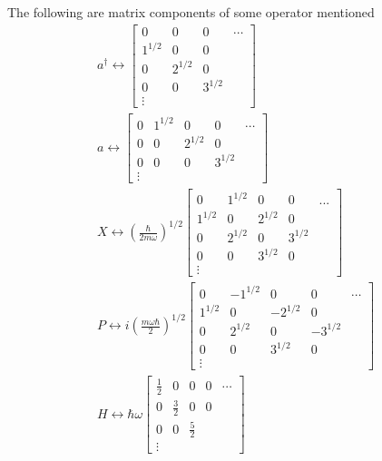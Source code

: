 \documentclass[../../../main.tex]{subfiles}
\begin{document}
The following are matrix components of some operator mentioned
\begin{gather*}
  a ^\dagger\leftrightarrow\begin{bmatrix}
    0 & 0 & 0 & \cdots \\ 1^{1/2} & 0 & 0 & \\ 0 & 2^{1/2} & 0 & \\ 0 & 0 & 3^{1/2} & \\ \vdots & & &
  \end{bmatrix}                                                                                                                                         \\
  a \leftrightarrow\begin{bmatrix}
    0 & 1^{1/2} & 0 & 0 & \cdots \\ 0 & 0 & 2^{1/2} & 0 & \\ 0 & 0 & 0 & 3^{1/2} & \\ \vdots & & & &
  \end{bmatrix}                                                                                                                                          \\
  X \leftrightarrow \left( \frac{\hbar}{2m\omega} \right)^{1/2} \begin{bmatrix} 0 & 1^{1/2} & 0 & 0 & ... \\ 1^{1/2} & 0 & 2^{1/2} & 0 & \\ 0 & 2^{1/2} & 0 & 3^{1/2} & \\ 0 & 0 & 3^{1/2} & 0 & \\ \vdots & & & & \end{bmatrix}           \\
  P \leftrightarrow i \left( \frac{m \omega \hbar}{2} \right)^{1/2} \begin{bmatrix} 0 & -1^{1/2} & 0 & 0 & \cdots \\ 1^{1/2} & 0 & -2^{1/2} & 0 & \\ 0 & 2^{1/2} & 0 & -3^{1/2} & \\ 0 & 0 & 3^{1/2} & 0 & \\ \vdots & & & & \end{bmatrix} \\
  H \leftrightarrow \hbar \omega \begin{bmatrix} \frac{1}{2} & 0 & 0 & 0 & \cdots \\ 0 & \frac{3}{2} & 0 & 0 & \\ 0 & 0 & \frac{5}{2} & & \\ \vdots & & & & \end{bmatrix}
\end{gather*}
\end{document}
